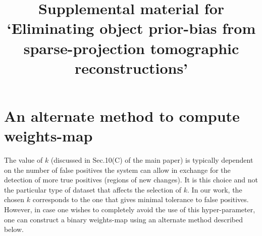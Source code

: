 \documentclass{article}
\title{Supplemental material for `Eliminating object prior-bias from sparse-projection
tomographic reconstructions'}
\begin{document}
\maketitle

\tableofcontents
\newpage
\section{An alternate method to compute weights-map}
The value of $k$ (discussed in Sec.10(C) of the main paper) is typically dependent on the number of false positives the system can allow in exchange for the detection of more true positives (regions of new changes). It is this choice and not the particular type of dataset that affects the selection of $k$. In our work, the chosen $k$ corresponds to the one that gives minimal tolerance to false positives.\\

However, in case one wishes to completely avoid the use of this hyper-parameter, one can construct a binary weights-map using an alternate method described below.
\end{document}
